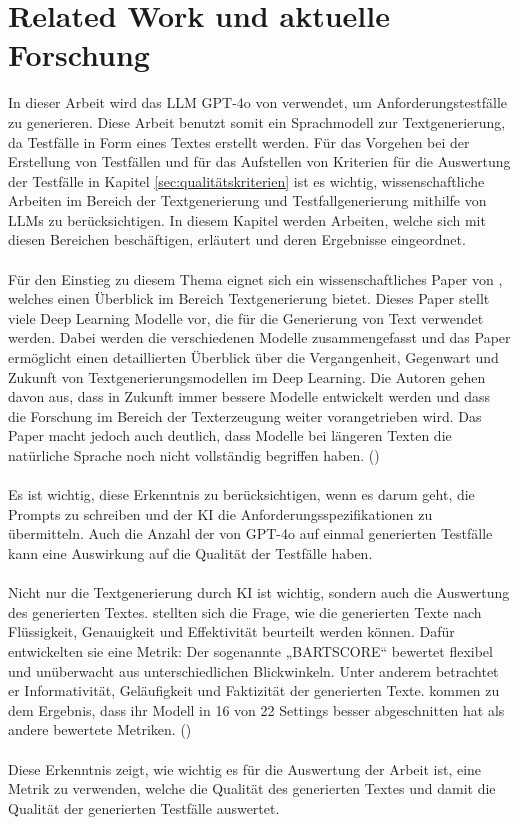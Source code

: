 \documentclass[12pt,toc=bib,toc=listof]{scrreprt}
\begin{document}
\chapter{Related Work und aktuelle Forschung} %
\label{sec:relatedWorkUndAktuelleForschung}
In dieser Arbeit wird das LLM GPT-4o von \textcite{OpenAI2025} verwendet, um Anforderungstestfälle zu generieren. Diese Arbeit benutzt somit ein Sprachmodell zur Textgenerierung, da Testfälle in Form eines Textes erstellt werden. Für das Vorgehen bei der Erstellung von Testfällen und für das Aufstellen von Kriterien für die Auswertung der Testfälle in Kapitel \ref{sec:qualitätskriterien} ist es wichtig, wissenschaftliche Arbeiten im Bereich der Textgenerierung und Testfallgenerierung mithilfe von LLMs zu berücksichtigen. In diesem Kapitel werden Arbeiten, welche sich mit diesen Bereichen beschäftigen, erläutert und deren Ergebnisse eingeordnet.\\
\\
Für den Einstieg zu diesem Thema eignet sich ein wissenschaftliches Paper von \textcite{Iqbal2022}, welches einen Überblick im Bereich Textgenerierung bietet. Dieses Paper stellt viele Deep Learning Modelle vor, die für die Generierung von Text verwendet werden. Dabei werden die verschiedenen Modelle zusammengefasst und das Paper ermöglicht einen detaillierten Überblick über die Vergangenheit, Gegenwart und Zukunft von Textgenerierungsmodellen im Deep Learning. Die Autoren \textcite{Iqbal2022} gehen davon aus, dass in Zukunft immer bessere Modelle entwickelt werden und dass die Forschung im Bereich der Texterzeugung weiter vorangetrieben wird. Das Paper macht jedoch auch deutlich, dass Modelle bei längeren Texten die natürliche Sprache noch nicht vollständig begriffen haben. (\cite{Iqbal2022})\\
\\
Es ist wichtig, diese Erkenntnis zu berücksichtigen, wenn es darum geht, die Prompts zu schreiben und der KI die Anforderungsspezifikationen zu übermitteln. Auch die Anzahl der von GPT-4o auf einmal generierten Testfälle kann eine Auswirkung auf die Qualität der Testfälle haben.\\
\\
Nicht nur die Textgenerierung durch KI ist wichtig, sondern auch die Auswertung des generierten Textes. \textcite{Yuan2021} stellten sich die Frage, wie die generierten Texte nach Flüssigkeit, Genauigkeit und Effektivität beurteilt werden können. Dafür entwickelten sie eine Metrik: Der sogenannte „BARTSCORE“ bewertet flexibel und unüberwacht aus unterschiedlichen Blickwinkeln. Unter anderem betrachtet er Informativität, Geläufigkeit und Faktizität der generierten Texte. \textcite{Yuan2021} kommen zu dem Ergebnis, dass ihr Modell in 16 von 22 Settings besser abgeschnitten hat als andere bewertete Metriken. (\cite{Yuan2021})\\
\\
Diese Erkenntnis zeigt, wie wichtig es für die Auswertung der Arbeit ist, eine Metrik zu verwenden, welche die Qualität des generierten Textes und damit die Qualität der generierten Testfälle auswertet.\\
\newpage
\end{document}
